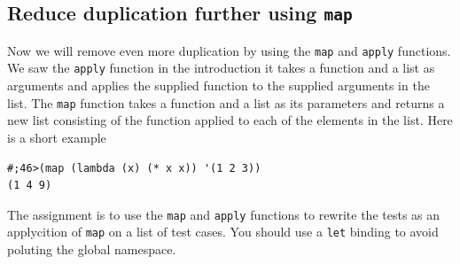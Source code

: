\documentclass[12pt,a4paper,english,twoside]{article}
\begin{document}
\subsection{Reduce duplication further using \texttt{map}}
Now we will remove even more duplication by using the \texttt{map} and 
\texttt{apply} functions. We saw the \texttt{apply} function in the 
introduction it takes a function and a list as arguments and applies the 
supplied function to the supplied arguments in the list. The \texttt{map} 
function takes a function and a list as its parameters and returns a new list 
consisting of the function applied to each of the elements in the list.
Here is a short example
\begin{lstlisting}
#;46>(map (lambda (x) (* x x)) '(1 2 3))
(1 4 9)
\end{lstlisting}
The assignment is to use the \texttt{map} and \texttt{apply} functions to 
rewrite the tests as an applycition of \texttt{map} on a list of test cases.
You should use a \texttt{let} binding to avoid poluting the global namespace.
\end{document}
